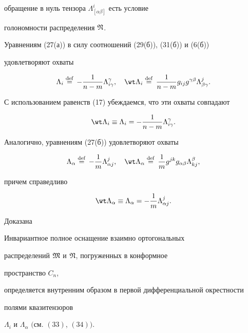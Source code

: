 обращение в нуль тензора $\Lambda^i_{[\alpha\beta]}$ есть условие 


голономности распределения $\frak N$. 


 


Уравнениям (27(а)) в силу соотношений (29(б)), (31(б)) и (6(б)) 


удовлетворяют охваты 


$$ 


\Lambda_i\eqdef-\frac{1}{n-m}\Lambda^\gamma_{i\gamma},\quad 


\wt\Lambda_i\eqdef\frac{1}{n-m}g_{ij}g^{\gamma\beta} 


\Lambda^j_{\beta\gamma}. 


$$ 


С использованием равенств (17) убеждаемся, что эти охваты совпадают 


\begin{equation} 


\wt\Lambda_i\equiv\Lambda_i=-\frac{1}{n-m}


\Lambda^\gamma_{i\gamma}.


\end{equation} 


Аналогично, уравнениям (27(б)) удовлетворяют охваты 


$$ 


\Lambda_\alpha\eqdef-\frac{1}{m}\Lambda^j_{\alpha j},\quad 


\wt\Lambda_\alpha\eqdef\frac{1}{m}g^{j k}g_{\alpha\beta} 


\Lambda^\beta_{k j}, 


$$ 


причем справедливо 


\begin{equation} 


\wt\Lambda_\alpha\equiv\Lambda_\alpha=-\frac{1}{m} 


\Lambda^j_{\alpha j}. 


\end{equation} 


 


Доказана 


 


\begin{thm} 


Инвариантное полное оснащение взаимно ортогональных 


распределений $\frak M$ и $\frak N$, погруженных в конформное 


пространство $C_n$, 


определяется внутренним образом в первой дифференциальной окрестности 


полями квазитензоров 


$\Lambda_i$ и $\Lambda_\alpha$ $($см. $(33)$, $(34))$. 


\end{thm} 



